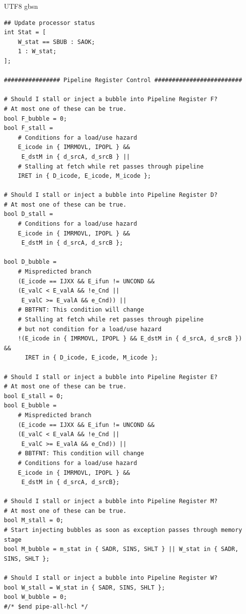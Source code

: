 \documentclass {article}
\begin{document}
\begin {CJK*} {UTF8} {gbsn}
\begin{lstlisting}
## Update processor status
int Stat = [
	W_stat == SBUB : SAOK;
	1 : W_stat;
];

################ Pipeline Register Control #########################

# Should I stall or inject a bubble into Pipeline Register F?
# At most one of these can be true.
bool F_bubble = 0;
bool F_stall =
	# Conditions for a load/use hazard
	E_icode in { IMRMOVL, IPOPL } &&
	 E_dstM in { d_srcA, d_srcB } ||
	# Stalling at fetch while ret passes through pipeline
	IRET in { D_icode, E_icode, M_icode };

# Should I stall or inject a bubble into Pipeline Register D?
# At most one of these can be true.
bool D_stall = 
	# Conditions for a load/use hazard
	E_icode in { IMRMOVL, IPOPL } &&
	 E_dstM in { d_srcA, d_srcB };

bool D_bubble =
	# Mispredicted branch
	(E_icode == IJXX && E_ifun != UNCOND &&
	(E_valC < E_valA && !e_Cnd ||
	 E_valC >= E_valA && e_Cnd)) ||
	# BBTFNT: This condition will change
	# Stalling at fetch while ret passes through pipeline
	# but not condition for a load/use hazard
	!(E_icode in { IMRMOVL, IPOPL } && E_dstM in { d_srcA, d_srcB }) &&
	  IRET in { D_icode, E_icode, M_icode };

# Should I stall or inject a bubble into Pipeline Register E?
# At most one of these can be true.
bool E_stall = 0;
bool E_bubble =
	# Mispredicted branch
	(E_icode == IJXX && E_ifun != UNCOND &&
	(E_valC < E_valA && !e_Cnd ||
	 E_valC >= E_valA && e_Cnd)) ||
	# BBTFNT: This condition will change
	# Conditions for a load/use hazard
	E_icode in { IMRMOVL, IPOPL } &&
	 E_dstM in { d_srcA, d_srcB};

# Should I stall or inject a bubble into Pipeline Register M?
# At most one of these can be true.
bool M_stall = 0;
# Start injecting bubbles as soon as exception passes through memory stage
bool M_bubble = m_stat in { SADR, SINS, SHLT } || W_stat in { SADR, SINS, SHLT };

# Should I stall or inject a bubble into Pipeline Register W?
bool W_stall = W_stat in { SADR, SINS, SHLT };
bool W_bubble = 0;
#/* $end pipe-all-hcl */
			\end{lstlisting}

  \end {CJK*}
\end{document}
